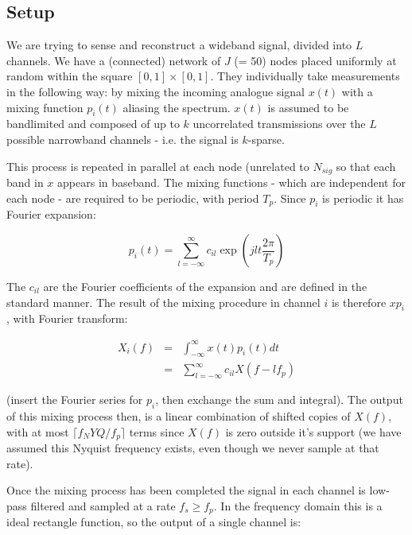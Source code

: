 \subsection{Setup}
We are trying to sense and reconstruct a wideband signal, divided into \(L\) channels. We have a (connected) network of \(J\) (= 50) nodes placed uniformly at random within the square \(  \left[0,1\right]\times \left[0,1\right] \). They individually take measurements in the following way: by mixing the incoming analogue signal \(x\left(t\right)\) with a mixing function \(p_i\left(t\right)\) aliasing the spectrum. \(x\left(t\right)\) is assumed to be bandlimited and composed of up to \(k\) uncorrelated transmissions over the \(L\) possible narrowband channels - i.e. the signal is \(k\)-sparse. 

This process is repeated in parallel at each node (unrelated to \(N_{sig}\) so that each band in \(x\) appears in baseband. The mixing functions - which are independent for each node - are required to be periodic, with period \(T_p\). Since \(p_i\) is periodic it has Fourier expansion:

\begin{equation}
p_i\left(t\right) = \sum_{l=-\infty}^{\infty} c_{il} \exp\left({jlt\frac{2\pi}{T_p}}\right)
\end{equation}

The \(c_{il}\) are the Fourier coefficients of the expansion and are defined in the standard manner. The result of the mixing procedure in channel \(i\) is therefore \(xp_i\), with Fourier transform:

\begin{align}
X_{i}\left(f\right) &=& \int_{-\infty}^{\infty} x\left(t\right) p_i\left(t\right) dt
\\ &=& \sum_{l=-\infty}^{\infty} c_{il} X\left(f-lf_p\right)
\end{align}

(insert the Fourier series for \(p_i\), then exchange the sum and integral). The output of this mixing process then, is a linear combination of shifted copies of \(X\left(f\right)\), with at most \(\lceil f_NYQ/f_p\rceil\) terms since \(X\left(f\right)\) is zero outside it's support (we have assumed this Nyquist frequency exists, even though we never sample at that rate).

Once the mixing process has been completed the signal in each channel is low-pass filtered and sampled at a rate \(f_s \geq f_p\). In the frequency domain this is a ideal rectangle function, so the output of a single channel is:

